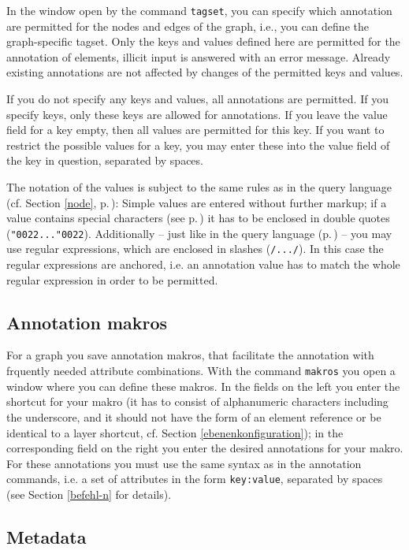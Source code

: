 \documentclass[12pt]{scrartcl}
\newcommand{\quo}{\char"0022}
\begin{document}
In the window open by the command \texttt{tagset}, you can specify which annotation are permitted for the nodes and edges of the graph, i.e., you can define the graph-specific tagset.
Only the keys and values defined here are permitted for the annotation of elements, illicit input is answered with an error message.
Already existing annotations are not affected by changes of the permitted keys and values.

If you do not specify any keys and values, all annotations are permitted.
If you specify keys, only these keys are allowed for annotations.
If you leave the value field for a key empty, then all values are permitted for this key.
If you want to restrict the possible values for a key, you may enter these into the value field of the key in question, separated by spaces.

The notation of the values is subject to the same rules as in the query language (cf. Section \ref{node}, p.\,\pageref{zeichenketten}):
Simple values are entered without further markup; if a value contains special characters (see p.\,\pageref{zeichenketten}) it has to be enclosed in double quotes (\texttt{\quo...\quo}).
Additionally – just like in the query language (p.\,\pageref{zeichenketten}) – you may use regular expressions, which are enclosed in slashes (\texttt{/.../}).
In this case the regular expressions are anchored, i.e. an annotation value has to match the whole regular expression in order to be permitted.

\subsection{Annotation makros}\label{annotationsmakros}

For a graph you save annotation makros, that facilitate the annotation with frquently needed attribute combinations.
With the command \texttt{makros} you open a window where you can define these makros.
In the fields on the left you enter the shortcut for your makro (it has to consist of alphanumeric characters including the underscore, and it should not have the form of an element reference or be identical to a layer shortcut, cf. Section \ref{ebenenkonfiguration}); in the corresponding field on the right you enter the desired annotations for your makro.
For these annotations you must use the same syntax as in the annotation commands, i.e. a set of attributes in the form \texttt{key:value}, separated by spaces (see Section \ref{befehl-n} for details).

\subsection{Metadata}
\end{document}
